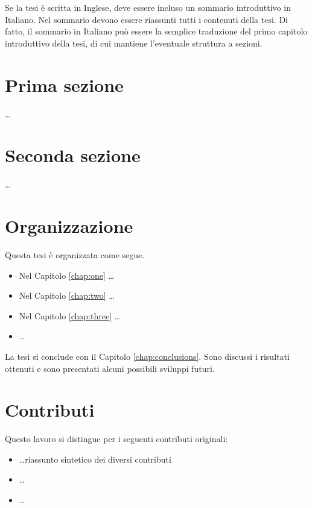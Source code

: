 Se la tesi \`e  scritta in Inglese, deve essere incluso un sommario introduttivo in Italiano. Nel sommario devono essere riassunti tutti i contenuti della tesi. Di fatto, il sommario in Italiano pu\`o essere la semplice traduzione del primo capitolo introduttivo della tesi, di cui mantiene l'eventuale struttura a sezioni.

\section*{Prima sezione}
\dots

\section*{Seconda sezione}
\dots

\section*{Organizzazione}
Questa tesi \`e organizzata come segue. 
\begin{itemize}
\item Nel Capitolo \ref{chap:one} \dots
\item Nel Capitolo \ref{chap:two} \dots
\item Nel Capitolo \ref{chap:three} \dots
\item \dots
\end{itemize}
La tesi si conclude con il Capitolo \ref{chap:conclusions}. Sono
discussi i risultati ottenuti e sono presentati alcuni possibili
sviluppi futuri.


\section*{Contributi}
Questo lavoro si distingue per i seguenti contributi originali:
\begin{itemize}
\item \dots riassunto sintetico dei diversi contributi
\item \dots
\item \dots
\end{itemize}
